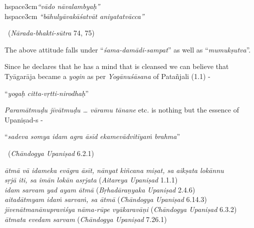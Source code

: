 \begin{myquote}
hspace{3cm}\textit{“vādo nāvalambyaḥ”}\\hspace{3cm} \textit{“bāhulyāvakāśatvāt aniyatatvācca”} 

~\hfill (\textit{Nārada-bhakti-sūtra} 74, 75)
\end{myquote}

The above attitude falls under “\textit{śama-damādi-sampat}” as well as “\textit{mumukṣutva}”.

Since he declares that he has a mind that is cleansed we can believe that Tyāgarāja became a \textit{yogin} as per \textit{Yogānuśāsana} of Patañjali (1.1) -

\begin{myquote}
“\textit{yogaḥ citta-vṛtti-nirodhaḥ}”
\end{myquote}

\textit{Paramātmuḍu jīvātmuḍu … vāramu tānane} etc. is nothing but the essence of Upaniṣad-s -

\begin{myquote}
“\textit{sadeva somya idam agra āsīd ekamevādvitīyaṁ brahma}” 

~\hfill (\textit{Chāndogya Upaniṣad} 6.2.1)
\end{myquote}

\begin{myquote}
\textit{ātmā vā idameka evāgra āsīt, nānyat kiñcana miṣat, sa aikṣata lokānnu}\\\textit{sṛjā iti, sa imān lokān asṛjata} (\textit{Aitareya Upaniṣad} 1.1.1)\\\textit{idam sarvam yad ayam ātmā} (\textit{Bṛhadāraṇyaka Upaniṣad} 2.4.6)\\\textit{aitadātmyam idaṁ sarvaṁ, sa ātmā} (\textit{Chāndogya Upaniṣad} 6.14.3)\\\textit{jīvenātmanānupraviśya nāma-rūpe vyākaravāṇi} (\textit{Chāndogya Upaniṣad} 6.3.2)\\\textit{ātmata evedam sarvam} (\textit{Chāndogya Upaniṣad} 7.26.1)
\end{myquote}


